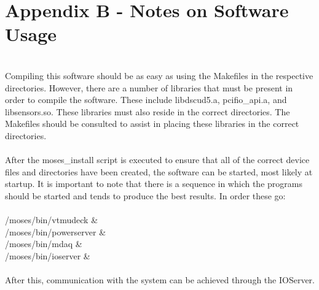 
\section{Appendix B - Notes on Software Usage}
\hrulefill
\\ 
Compiling this software should be as easy as using the Makefiles in the
respective directories. However, there are a number of libraries that must be
present in order to compile the software. These include libdscud5.a, pcifio\_api.a,
and libsensors.so. These libraries must also reside in the correct directories.
The Makefiles should be consulted to assist in placing these libraries in the correct
directories.\\
\\
After the moses\_install script is executed to ensure that all of the correct device files
and directories have been created, the software can be started, most likely at startup. It is important
to note that there is a sequence in which the programs should be started and tends to produce the 
best results. In order these go:\\
\\
/moses/bin/vtmudeck \& \\
/moses/bin/powerserver \& \\
/moses/bin/mdaq \& \\
/moses/bin/ioserver \& \\
\\
After this, communication with the system can be achieved through the IOServer.



